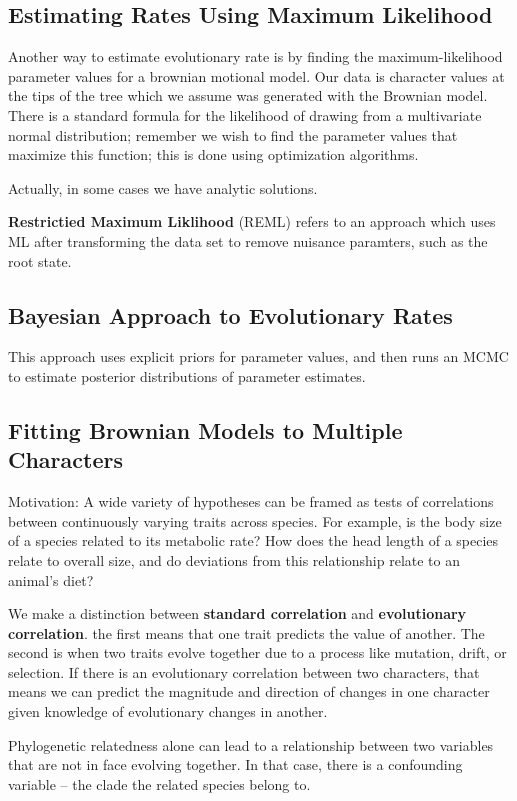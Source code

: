 \documentclass{article}
\begin{document}
\subsection{Estimating Rates Using Maximum Likelihood}
Another way to estimate evolutionary rate is by finding the maximum-likelihood
parameter values for a brownian motional model. Our data is character values at
the tips of the tree which we assume was generated with the Brownian model.
There is a standard formula for the likelihood of drawing from a multivariate
normal distribution; remember we wish to find the parameter values that maximize
this function; this is done using optimization algorithms.

Actually, in some cases we have analytic solutions.

\textbf{Restrictied Maximum Liklihood} (REML) refers to an approach which uses
ML after transforming the data set to remove nuisance paramters, such as the
root state.


\subsection{Bayesian Approach to Evolutionary Rates}
This approach uses explicit priors for parameter values, and then runs an MCMC
to estimate posterior distributions of parameter estimates.


\subsection{Fitting Brownian Models to Multiple Characters}
Motivation: A wide variety of hypotheses can be framed as tests of correlations
between continuously varying traits across species. For example, is the body
size of a species related to its metabolic rate? How does the head length of a
species relate to overall size, and do deviations from this relationship relate
to an animal’s diet?

We make a distinction between \textbf{standard correlation} and
\textbf{evolutionary correlation}. the first means that one trait predicts the
value of another. The second is when two traits evolve together due to a process
like mutation, drift, or selection. If there is an evolutionary correlation
between two characters, that means we can predict the magnitude and direction of
changes in one character given knowledge of evolutionary changes in another.

Phylogenetic relatedness alone can lead to a relationship between two variables
that are not in face evolving together. In that case, there is a confounding
variable -- the clade the related species belong to.
\end{document}
